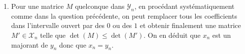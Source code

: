 \begin{enumerate}
\begin{enumerate}
  \item Pour une matrice $M$ quelconque dans $\mathcal{Y}_n$, en procédant systématiquement comme dans la question précédente, on peut remplacer tous les coefficients dans l'intervalle ouvert par des $0$ ou des $1$ et obtenir finalement une matrice $M'\in \mathcal{X}_n$ telle que $\det(M)\leq \det(M')$. On en déduit que $x_n$ est un majorant de $y_n$ donc que $x_n=y_n$. 
\end{enumerate}
\end{enumerate}
